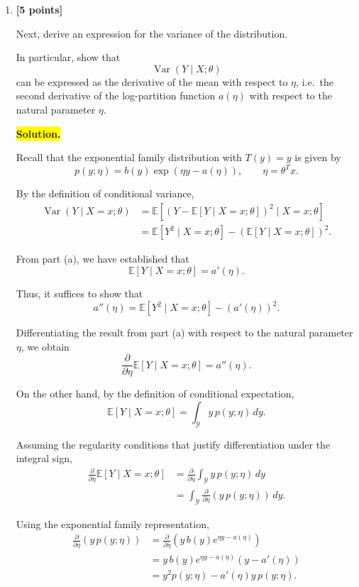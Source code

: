 \documentclass[10pt]{article}
\begin{document}
\begin{enumerate}
\begin{enumerate}[label=(\alph*)]
\item \textbf{[5 points]}

Next, derive an expression for the variance of the distribution.

In particular, show that
\[
\operatorname{Var}(Y\mid X;\theta)
\]
can be expressed as the derivative of the mean with respect to $\eta$,
i.e.\ the second derivative of the log-partition function
$a(\eta)$ with respect to the natural parameter $\eta$.


\medskip
\noindent\colorbox{yellow}{\textbf{Solution.}}
\vspace{3mm}

Recall that the exponential family distribution with $T(y)=y$ is
given by
\[
p(y;\eta)=b(y)\exp\left(\eta y-a(\eta)\right),
\qquad \eta=\theta^T x.
\]

By the definition of conditional variance,
\[
\begin{aligned}
\operatorname{Var}(Y\mid X=x;\theta)
&=\mathbb{E}\left[
\left(Y-\mathbb{E}[Y\mid X=x;\theta]\right)^2
\mid X=x;\theta
\right]\\
&=\mathbb{E}[Y^2\mid X=x;\theta]
-\left(\mathbb{E}[Y\mid X=x;\theta]\right)^2.
\end{aligned}
\]

From part (a), we have established that
\[
\mathbb{E}[Y\mid X=x;\theta]=a'(\eta).
\]

Thus, it suffices to show that
\[
a''(\eta)
=
\mathbb{E}[Y^2\mid X=x;\theta]
-\left(a'(\eta)\right)^2.
\]

Differentiating the result from part (a) with respect to
the natural parameter $\eta$, we obtain
\[
\frac{\partial}{\partial\eta}
\mathbb{E}[Y\mid X=x;\theta]
=
a''(\eta).
\]

On the other hand, by the definition of conditional expectation,
\[
\mathbb{E}[Y\mid X=x;\theta]
=
\int_{\mathcal Y}y\,p(y;\eta)\,dy.
\]

Assuming the regularity conditions that justify differentiation
under the integral sign,
\[
\begin{aligned}
\frac{\partial}{\partial\eta}
\mathbb{E}[Y\mid X=x;\theta]
&=
\frac{\partial}{\partial\eta}
\int_{\mathcal Y}y\,p(y;\eta)\,dy\\
&=
\int_{\mathcal Y}
\frac{\partial}{\partial\eta}
\left(y\,p(y;\eta)\right)\,dy.
\end{aligned}
\]

Using the exponential family representation,
\[
\begin{aligned}
\frac{\partial}{\partial\eta}
\left(y\,p(y;\eta)\right)
&=
\frac{\partial}{\partial\eta}
\left(y\,b(y)e^{\eta y-a(\eta)}\right)\\
&=
y\,b(y)e^{\eta y-a(\eta)}
\left(y-a'(\eta)\right)\\
&=
y^2p(y;\eta)-a'(\eta)y\,p(y;\eta).
\end{aligned}
\]


\end{enumerate}
\end{enumerate}
\end{document}
